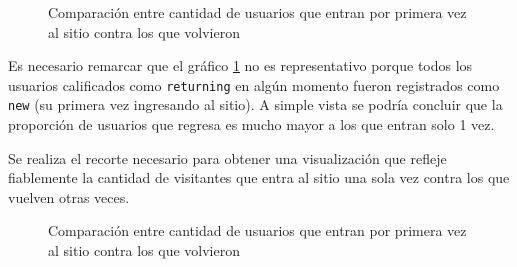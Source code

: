 \documentclass[a4paper]{article}
\begin{document}
\begin{figure}[h!]
	\caption{Comparación entre cantidad de usuarios que entran por primera vez al sitio contra los que volvieron}
	\label{fig:newvsreturningfalse}
\end{figure}

Es necesario remarcar que el gráfico \ref{fig:newvsreturningfalse} no es representativo porque todos los usuarios calificados como \texttt{returning} en algún momento fueron registrados como \texttt{new} (su primera vez ingresando al sitio). A simple vista se podría concluir que la proporción de usuarios que regresa es mucho mayor a los que entran solo 1 vez. 

Se realiza el recorte necesario para obtener una visualización que refleje fiablemente la cantidad de visitantes que entra al sitio una sola vez contra los que vuelven otras veces. 

\begin{figure}[h!]
	\caption{Comparación entre cantidad de usuarios que entran por primera vez al sitio contra los que volvieron}
	\label{fig:newvsreturning}
\end{figure}
\end{document}
